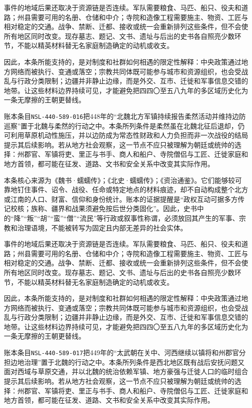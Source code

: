 事件的地域后果还取决于资源链是否连续。军队需要粮食、马匹、船只、役夫和道路；州县需要可用的名册、仓储和中介；寺院和造像工程需要施主、物资、工匠与相对稳定的交通。战争、禁断、迁都、接收或统一会重新排列这些条件，但不会使所有地区同时改变。现存墓志、题记、文书、遗址与后出的史书各自照亮少数环节，不能以精英材料替无名家庭制造确定的动机或收支。

因此，本条所能支持的，是对制度和社群如何相遇的限定性解释：中央政策通过地方网络而被执行、变通或落空；宗教共同体既可能参与城市和资源组织，也会受战乱与行政分类限制；边疆并非静止边缘，而是外交、互市、迁徙和军事信息交错的地带。让这些材料边界持续可见，才能避免把四四〇至五八九年的多区域历史化为一条无摩擦的王朝更替线。

账本条目\texttt{NSL-440-589-016}把448年的“北魏北方军镇持续报告柔然活动并维持边防巡察”置于北魏与柔然的行动之中。本条所列条件是柔然虽在北魏北征后退却，仍可利用草原机动性施压，并以边防成为常态性财政和人力负担而非一次战役的结局提示其后续影响。若从地方社会观察，这一节点不应只被理解为朝廷或统帅的选择：州郡官、军镇将吏、里正与书手、商人和船户、寺院僧侣与工匠、迁徙家庭和地方首领，都可能在征发、道路、文书和安全关系中改变其实际作用。

本条核心来源为《魏书·蠕蠕传》；《北史·蠕蠕传》；《资治通鉴》。它们能够较可靠地钉住事件、诏令、战役、任命或特定地点的材料痕迹，却不自动构成整个北方或江南的人口、财富、信仰和身份统计。账本的证据提醒是“政权互动可据多方传记校核；族称、疆界和战果须避免按后世分类固化”。因此，史书中的“降”“叛”“胡”“蛮”“僧”“流民”等行政或叙事性称谓，必须放回其产生的军事、宗教和治理语境，不能被转写为固定且内部无差异的社会实体。

事件的地域后果还取决于资源链是否连续。军队需要粮食、马匹、船只、役夫和道路；州县需要可用的名册、仓储和中介；寺院和造像工程需要施主、物资、工匠与相对稳定的交通。战争、禁断、迁都、接收或统一会重新排列这些条件，但不会使所有地区同时改变。现存墓志、题记、文书、遗址与后出的史书各自照亮少数环节，不能以精英材料替无名家庭制造确定的动机或收支。

因此，本条所能支持的，是对制度和社群如何相遇的限定性解释：中央政策通过地方网络而被执行、变通或落空；宗教共同体既可能参与城市和资源组织，也会受战乱与行政分类限制；边疆并非静止边缘，而是外交、互市、迁徙和军事信息交错的地带。让这些材料边界持续可见，才能避免把四四〇至五八九年的多区域历史化为一条无摩擦的王朝更替线。

账本条目\texttt{NSL-440-589-017}把449年的“太武朝在关中、河西继续以镇将和州郡官分担边地治理”置于北魏的行动之中。本条所列条件是西北地区既有战后安抚问题又面对西域与草原交通，并以北魏的统治依赖军镇、地方豪强与迁徙人口的临时组合提示其后续影响。若从地方社会观察，这一节点不应只被理解为朝廷或统帅的选择：州郡官、军镇将吏、里正与书手、商人和船户、寺院僧侣与工匠、迁徙家庭和地方首领，都可能在征发、道路、文书和安全关系中改变其实际作用。


